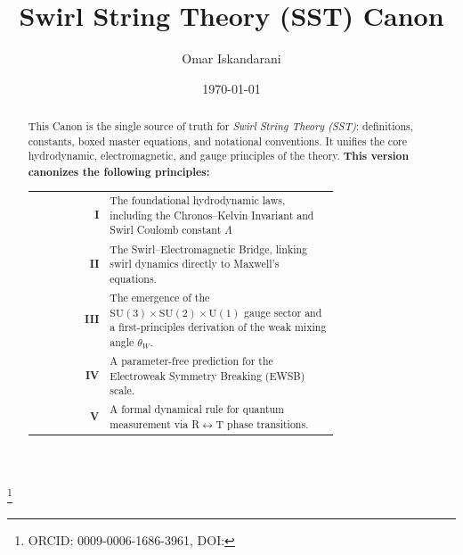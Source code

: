 \documentclass[reprint,aps,onecolumn,nofootinbib]{revtex4-2}
\newcommand{\Lam}{\Lambda}                               %
\begin{document}
	\title{Swirl String Theory (SST) Canon \canonversion}
	\author{Omar Iskandarani}
    \thanks{ORCID: 0009-0006-1686-3961, DOI: \paperdoi}
	\date{\today}

    \begin{abstract}
    This Canon is the single source of truth for \emph{Swirl String Theory (SST)}: definitions, constants, boxed master equations, and notational conventions. It unifies the core hydrodynamic, electromagnetic, and gauge principles of the theory.
    \textbf{This version canonizes the following principles:}

    \begin{tabular}{r@{\quad}p{0.75\linewidth}}
        \textbf{I} & The foundational hydrodynamic laws, including the Chronos–Kelvin Invariant and Swirl Coulomb constant $\Lam$ \\
        \textbf{II} & The Swirl–Electromagnetic Bridge, linking swirl dynamics directly to Maxwell's equations.\\
        \textbf{III} & The emergence of the $\mathrm{SU}(3)\times\mathrm{SU}(2)\times\mathrm{U}(1)$ gauge sector and a first-principles derivation of the weak mixing angle $\theta_W$.\\
        \textbf{IV} & A parameter-free prediction for the Electroweak Symmetry Breaking (EWSB) scale. \\
        \textbf{V} & A formal dynamical rule for quantum measurement via R$\leftrightarrow$T phase transitions. \\
    \end{tabular}



\end{abstract}
\end{document}
